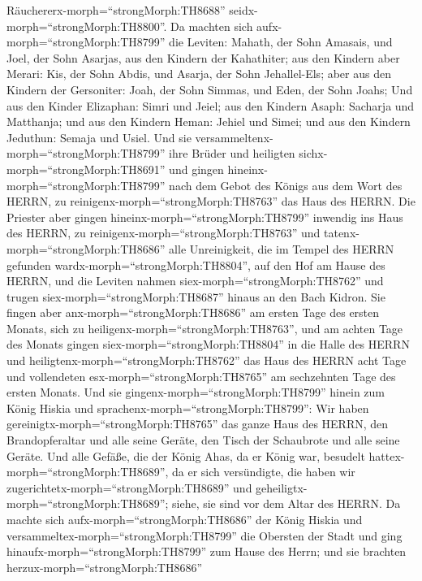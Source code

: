 Räuchererx-morph=``strongMorph:TH8688''
seidx-morph=``strongMorph:TH8800''.  Da machten sich
aufx-morph=``strongMorph:TH8799'' die Leviten: Mahath, der Sohn Amasais,
und Joel, der Sohn Asarjas, aus den Kindern der Kahathiter; aus den
Kindern aber Merari: Kis, der Sohn Abdis, und Asarja, der Sohn
Jehallel-Els; aber aus den Kindern der Gersoniter: Joah, der Sohn
Simmas, und Eden, der Sohn Joahs;  Und aus den Kinder
Elizaphan: Simri und Jeiel; aus den Kindern Asaph: Sacharja und
Matthanja;  und aus den Kindern Heman: Jehiel und Simei;
und aus den Kindern Jeduthun: Semaja und Usiel.  Und sie
versammeltenx-morph=``strongMorph:TH8799'' ihre Brüder und heiligten
sichx-morph=``strongMorph:TH8691'' und gingen
hineinx-morph=``strongMorph:TH8799'' nach dem Gebot des Königs aus dem
Wort des HERRN, zu reinigenx-morph=``strongMorph:TH8763'' das Haus des
HERRN.  Die Priester aber gingen
hineinx-morph=``strongMorph:TH8799'' inwendig ins Haus des HERRN, zu
reinigenx-morph=``strongMorph:TH8763'' und
tatenx-morph=``strongMorph:TH8686'' alle Unreinigkeit, die im Tempel des
HERRN gefunden wardx-morph=``strongMorph:TH8804'', auf den Hof am Hause
des HERRN, und die Leviten nahmen siex-morph=``strongMorph:TH8762'' und
trugen siex-morph=``strongMorph:TH8687'' hinaus an den Bach Kidron.
 Sie fingen aber anx-morph=``strongMorph:TH8686'' am ersten
Tage des ersten Monats, sich zu heiligenx-morph=``strongMorph:TH8763'',
und am achten Tage des Monats gingen siex-morph=``strongMorph:TH8804''
in die Halle des HERRN und heiligtenx-morph=``strongMorph:TH8762'' das
Haus des HERRN acht Tage und vollendeten
esx-morph=``strongMorph:TH8765'' am sechzehnten Tage des ersten Monats.
 Und sie gingenx-morph=``strongMorph:TH8799'' hinein zum
König Hiskia und sprachenx-morph=``strongMorph:TH8799'': Wir haben
gereinigtx-morph=``strongMorph:TH8765'' das ganze Haus des HERRN, den
Brandopferaltar und alle seine Geräte, den Tisch der Schaubrote und alle
seine Geräte.  Und alle Gefäße, die der König Ahas, da er
König war, besudelt hattex-morph=``strongMorph:TH8689'', da er sich
versündigte, die haben wir zugerichtetx-morph=``strongMorph:TH8689'' und
geheiligtx-morph=``strongMorph:TH8689''; siehe, sie sind vor dem Altar
des HERRN.  Da machte sich
aufx-morph=``strongMorph:TH8686'' der König Hiskia und
versammeltex-morph=``strongMorph:TH8799'' die Obersten der Stadt und
ging hinaufx-morph=``strongMorph:TH8799'' zum Hause des Herrn;
 und sie brachten herzux-morph=``strongMorph:TH8686''
